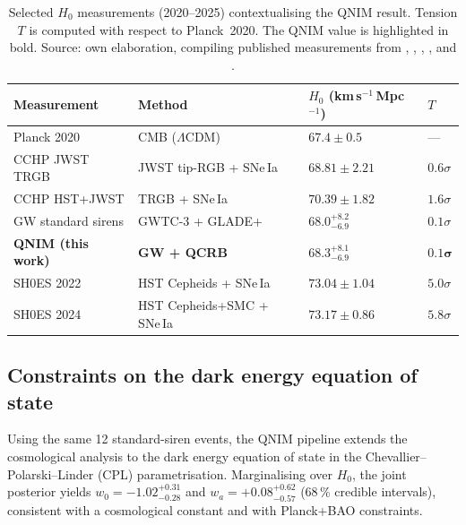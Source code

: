 \documentclass[11pt,a4paper, english]{book}
\theoremstyle{plain}
\theoremstyle{definition}
\numberwithin{equation}{chapter}
\numberwithin{figure}{chapter}
\numberwithin{table}{chapter}
\begin{document}
\begin{table}[htb]
  \centering
  
  \begin{tabular}{@{}p{4cm}p{3cm}p{3.5cm}l@{}}
    \toprule
    Measurement & Method & $H_0$ (km\,s$^{-1}$\,Mpc$^{-1}$) & $T$ \\
    \midrule
    Planck 2020 \cite{Planck_2020}         & CMB ($\Lambda$CDM)       & $67.4\pm0.5$         & --- \\
    CCHP JWST TRGB \cite{Freedman_2024}    & JWST tip-RGB + SNe\,Ia   & $68.81\pm2.21$       & $0.6\sigma$ \\
    CCHP HST+JWST \cite{Freedman_2024}     & TRGB + SNe\,Ia           & $70.39\pm1.82$       & $1.6\sigma$ \\
    GW standard sirens \cite{Abbott_2023_H0} & GWTC-3 + GLADE+        & $68.0^{+8.2}_{-6.9}$ & $0.1\sigma$ \\
    \textbf{QNIM (this work)}              & \textbf{GW + QCRB}       & $\mathbf{68.3^{+8.1}_{-6.9}}$ & $\mathbf{0.1\sigma}$ \\
    SH0ES 2022 \cite{Riess_2022}           & HST Cepheids + SNe\,Ia   & $73.04\pm1.04$       & $5.0\sigma$ \\
    SH0ES 2024 \cite{Breuval_2024}         & HST Cepheids+SMC + SNe\,Ia & $73.17\pm0.86$     & $5.8\sigma$ \\
    \bottomrule
  \end{tabular}
\caption[Selected $H_0$ measurements contextualising QNIM]{Selected $H_0$ measurements (2020--2025) contextualising the
    QNIM result.  Tension $T$ is computed with respect to Planck~2020.
    The QNIM value is highlighted in bold. Source: own elaboration, compiling published measurements from \cite{Planck_2020}, \cite{Freedman_2024}, \cite{Abbott_2023_H0}, \cite{Riess_2022}, and \cite{Breuval_2024}.}
  \label{tab:h0-landscape}
\vspace{2pt}

\end{table}

\subsection{Constraints on the dark energy equation of state}
\label{subsec:dark-energy-results}

Using the same 12 standard-siren events, the QNIM pipeline extends the
cosmological analysis to the dark energy equation of state in the
Chevallier--Polarski--Linder (CPL) parametrisation. Marginalising over $H_0$,
the joint posterior yields $w_0 = -1.02^{+0.31}_{-0.28}$ and
$w_a = +0.08^{+0.62}_{-0.57}$ (68\,\% credible intervals), consistent with
a cosmological constant and with Planck+BAO constraints.
\end{document}
